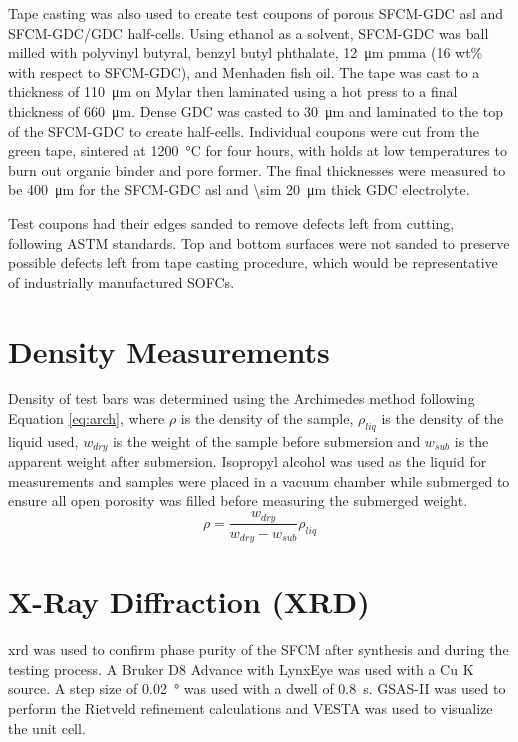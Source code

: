         Tape casting was also used to create test coupons of porous SFCM-GDC \gls{asl} and SFCM-GDC/GDC half-cells.
        Using ethanol as a solvent, SFCM-GDC was ball milled with polyvinyl butyral, benzyl butyl phthalate, \SI{12}{\micro\meter} \gls{pmma} (16 wt\% with respect to SFCM-GDC), and Menhaden fish oil.
        The tape was cast to a thickness of \SI{110}{\micro\meter} on Mylar then laminated using a hot press to a final thickness of \SI{660}{\micro\meter}.
        Dense GDC was casted to \SI{30}{\micro\meter} and laminated to the top of the SFCM-GDC to create half-cells.
        Individual coupons were cut from the green tape, sintered at \SI{1200}{\celsius} for four hours, with holds at low temperatures to burn out organic binder and pore former.
        The final thicknesses were measured to be \SI{400}{\micro\meter} for the SFCM-GDC \gls{asl} and \SI{\sim 20}{\micro\meter} thick GDC electrolyte.

        Test coupons had their edges sanded to remove defects left from cutting, following ASTM standards.\cite{ASTM2008}
        Top and bottom surfaces were not sanded to preserve possible defects left from tape casting procedure, which would be representative of industrially manufactured SOFCs.

\section{Density Measurements}
    Density of test bars was determined using the Archimedes method following Equation \ref{eq:arch}, where $\rho$ is the density of the sample, $\rho_{liq}$ is the density of the liquid used, $w_{dry}$ is the weight of the sample before submersion and $w_{sub}$ is the apparent weight after submersion.
    Isopropyl alcohol was used as the liquid for measurements and samples were placed in a vacuum chamber while submerged to ensure all open porosity was filled before measuring the submerged weight.
    \begin{equation}
    \rho = \frac{w_{dry}}{w_{dry}-w_{sub}}\rho_{liq}
    \label{eq:arch}
    \end{equation}

\section{X-Ray Diffraction (XRD)}
    \Gls{xrd} was used to confirm phase purity of the SFCM after synthesis and during the testing process.
    A Bruker D8 Advance with LynxEye was used with a Cu K\textsubscript{\textalpha{}} source.
    A step size of \SI{0.02}{\degree} was used with a dwell of \SI{0.8}{\second}.
    GSAS-II was used to perform the Rietveld refinement calculations and VESTA was used to visualize the unit cell.\cite{Toby2013,Momma2011}

